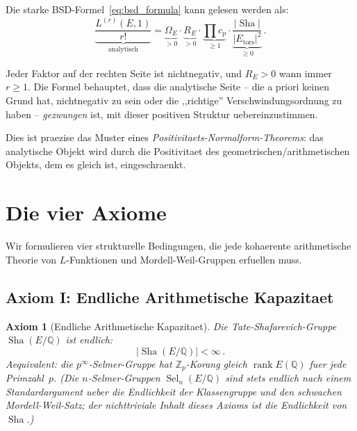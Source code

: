 \documentclass[aps,prd,twocolumn,superscriptaddress,nofootinbib]{revtex4-2}
\newtheorem{axiom}[theorem]{Axiom}
\theoremstyle{definition}
\theoremstyle{remark}
\DeclareMathOperator{\rank}{rank}
\DeclareMathOperator{\Sel}{Sel}
\DeclareMathOperator{\Sha}{Sha}
\begin{document}
Die starke BSD-Formel~\eqref{eq:bsd_formula} kann gelesen werden als:
\begin{equation}
\underbrace{\frac{L^{(r)}(E,1)}{r!}}_{\text{analytisch}} = \underbrace{\Omega_E}_{> 0} \cdot \underbrace{R_E}_{> 0} \cdot \underbrace{\prod c_p}_{\geq 1} \cdot \underbrace{\frac{|\Sha|}{|E_{\mathrm{tors}}|^2}}_{\geq 0}\,.
\label{eq:bsd_positivity}
\end{equation}

Jeder Faktor auf der rechten Seite ist nichtnegativ, und $R_E > 0$ wann immer $r \geq 1$. Die Formel behauptet, dass die analytische Seite -- die a priori keinen Grund hat, nichtnegativ zu sein oder die ,,richtige'' Verschwindungsordnung zu haben -- \textit{gezwungen} ist, mit dieser positiven Struktur uebereinzustimmen.

Dies ist praezise das Muster eines \textit{Positivitaets-Normalform-Theorems}: das analytische Objekt wird durch die Positivitaet des geometrischen/arithmetischen Objekts, dem es gleich ist, eingeschraenkt.


\section{Die vier Axiome}
\label{sec:axioms}

Wir formulieren vier strukturelle Bedingungen, die jede kohaerente arithmetische Theorie von $L$-Funktionen und Mordell-Weil-Gruppen erfuellen muss.

\subsection{Axiom I: Endliche Arithmetische Kapazitaet}

\begin{axiom}[Endliche Arithmetische Kapazitaet]
\label{ax:finite}
Die Tate-Shafarevich-Gruppe $\Sha(E/\mathbb{Q})$ ist endlich:
\begin{equation}
|\Sha(E/\mathbb{Q})| < \infty\,.
\end{equation}
Aequivalent: die $p^\infty$-Selmer-Gruppe hat $\mathbb{Z}_p$-Korang gleich $\rank E(\mathbb{Q})$ fuer jede Primzahl~$p$. (Die $n$-Selmer-Gruppen $\Sel_n(E/\mathbb{Q})$ sind stets endlich nach einem Standardargument ueber die Endlichkeit der Klassengruppe und den schwachen Mordell-Weil-Satz; der nichttriviale Inhalt dieses Axioms ist die Endlichkeit von~$\Sha$.)
\end{axiom}
\end{document}
